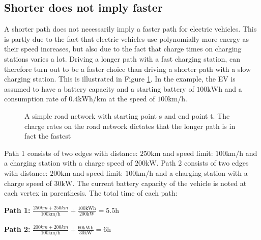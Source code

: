 \subsection{Shorter does not imply faster}
\label{sec:shorternotfaster}
A shorter path does not necessarily imply a faster path for electric vehicles. This is partly due to the fact that electric vehicles use polynomially more energy as their speed increases, but also due to the fact that charge times on charging stations varies a lot. Driving a longer path with a fast charging station, can therefore turn out to be a faster choice than driving a shorter path with a slow charging station. This is illustrated in Figure \ref{fig:simpleroad-network}. In the example, the EV is assumed to have a battery capacity and a starting battery of $100 \si{\kWh}$ and a consumption rate of $0.4\si{\kWh\per\km}$ at the speed of $100 \si{\km\per\hour}$.

\begin{figure}[!htb]
\centering
{}
\caption{A simple road network with starting point s and end point t. The charge rates on the road network dictates that the longer path is in fact the fastest}
\label{fig:simpleroad-network}
\end{figure}

Path 1 consists of two edges with distance: $ 250 \si{\km}$ and speed limit: $100 \si{\km\per\hour}$
and a charging station with a charge speed of $200 \si{\kW}$. Path 2 consists of two edges with distance: $200 \si{\km}$ and speed limit: $100 \si{\km\per\hour}$ and a charging station with a charge speed of $30\si{\kW}$. The current battery capacity of the vehicle is noted at each vertex in parenthesis. The total time of each path:
				
\textbf{Path 1:} $\frac{250\si{km} + 250\si{km}}{100\si{\km\per\hour}} + \frac{100\si{\kWh}}{200\si{\kW}} = 5.5\si{\hour}$

\textbf{Path 2:} $\frac{200\si{km} + 200\si{km}}{100 \si{\km\per\hour}} + \frac{60\si{\kWh}}{30\si{\kW}} = 6\si{\hour}$


